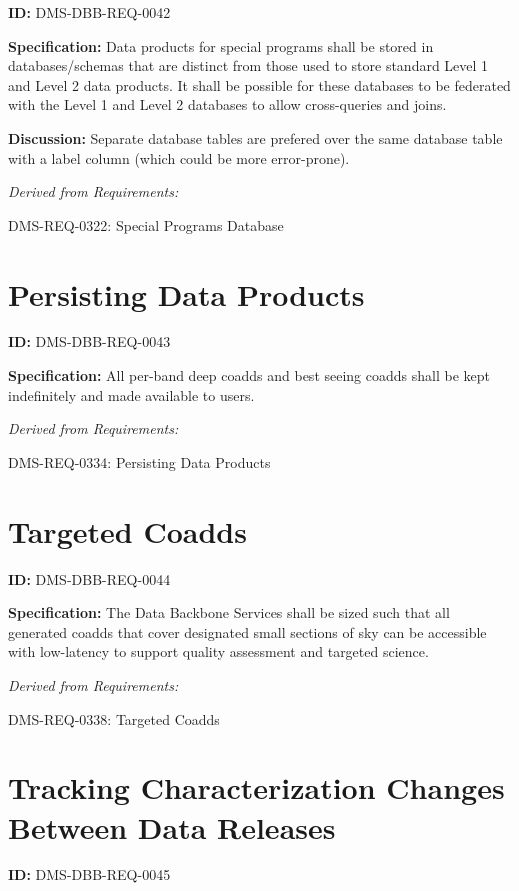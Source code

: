 \documentclass[SE,toc,lsstdraft]{lsstdoc}
\begin{document}
\label{DMS-DBB-REQ-0042}
\textbf{ID:} DMS-DBB-REQ-0042

\textbf{Specification:}
Data products for special programs shall be stored in databases/schemas that are distinct from those used to store standard Level 1 and Level 2 data products. It shall be possible for these databases to be federated with the Level 1 and Level 2 databases to allow cross-queries and joins.

\textbf{Discussion:}
Separate database tables are prefered over the same database table with a label column (which could be more error-prone).

\emph{Derived from Requirements:}

DMS-REQ-0322:
Special Programs Database \newline

\section{Persisting Data Products}

\label{DMS-DBB-REQ-0043}
\textbf{ID:} DMS-DBB-REQ-0043

\textbf{Specification:}
All per-band deep coadds and best seeing coadds shall be kept indefinitely and made available to users.

\emph{Derived from Requirements:}

DMS-REQ-0334:
Persisting Data Products \newline

\section{Targeted Coadds}

\label{DMS-DBB-REQ-0044}
\textbf{ID:} DMS-DBB-REQ-0044

\textbf{Specification:}
The Data Backbone Services shall be sized such that all generated coadds that cover designated small sections of sky can be accessible with low-latency to support quality assessment and targeted science.

\emph{Derived from Requirements:}

DMS-REQ-0338:
Targeted Coadds \newline

\section{Tracking Characterization Changes Between Data Releases}

\label{DMS-DBB-REQ-0045}
\textbf{ID:} DMS-DBB-REQ-0045
\end{document}
